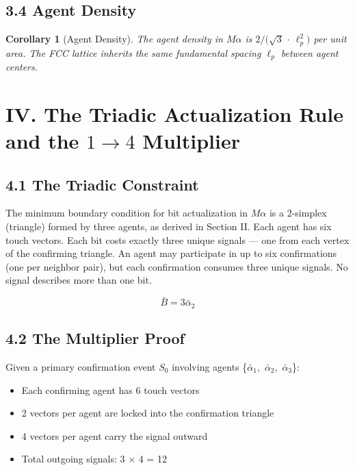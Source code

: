 \documentclass[11pt,oneside]{report}
\newtheorem{corollary}[theorem]{Corollary}
\theoremstyle{definition}
\theoremstyle{remark}
\begin{document}
\subsection*{3.4 Agent Density}

\begin{corollary}[Agent Density]
The agent density in \ensuremath{M\alpha} is \ensuremath{2/(\sqrt{3}} \ensuremath{\cdot} \ensuremath{\ell^{2}_{p})} per
unit area. The FCC lattice inherits the same fundamental spacing \ensuremath{\ell_{p}}
between agent centers.
\end{corollary}

\section*{IV. The Triadic Actualization Rule and the \ensuremath{1\to 4} Multiplier}

\subsection*{4.1 The Triadic Constraint}

The minimum boundary condition for bit actualization in \ensuremath{M\alpha} is a
2-simplex (triangle) formed by three agents, as derived in Section II.
Each agent has six touch vectors. Each bit costs exactly three unique
signals --- one from each vertex of the confirming triangle. An agent
may participate in up to six confirmations (one per neighbor pair), but
each confirmation consumes three unique signals. No signal describes
more than one bit.

\begin{equation*}
\bar{B} = 3\bar{\alpha}_{2}
\end{equation*}

\subsection*{4.2 The Multiplier Proof}

Given a primary confirmation event \ensuremath{S_{0}} involving agents \{\ensuremath{\bar{\alpha}_{1},} \ensuremath{\bar{\alpha}_{2},} \ensuremath{\bar{\alpha}_{3}}\}:

\begin{itemize}
\item
  Each confirming agent has 6 touch vectors
\item
  2 vectors per agent are locked into the confirmation triangle
\item
  4 vectors per agent carry the signal outward
\item
  Total outgoing signals: 3 \ensuremath{\times} 4 = 12
\end{itemize}
\end{document}
